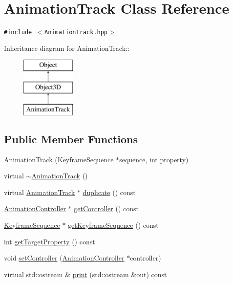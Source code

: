 \hypertarget{classm3g_1_1AnimationTrack}{
\section{AnimationTrack Class Reference}
\label{classm3g_1_1AnimationTrack}
}
{\tt \#include $<$AnimationTrack.hpp$>$}

Inheritance diagram for AnimationTrack::\begin{figure}[H]
\begin{center}
\leavevmode
\includegraphics[height=3cm]{classm3g_1_1AnimationTrack}
\end{center}
\end{figure}
\subsection*{Public Member Functions}
\begin{CompactItemize}
\item 
\hyperlink{classm3g_1_1AnimationTrack_e27012f60e982597d6e504c488e51106}{AnimationTrack} (\hyperlink{classm3g_1_1KeyframeSequence}{KeyframeSequence} $\ast$sequence, int property)
\item 
virtual \hyperlink{classm3g_1_1AnimationTrack_f7f1bc360c298d4a2f2436889159205c}{$\sim$AnimationTrack} ()
\item 
virtual \hyperlink{classm3g_1_1AnimationTrack}{AnimationTrack} $\ast$ \hyperlink{classm3g_1_1AnimationTrack_e19aae30ee68ef05afd74ec9c19cf7d1}{duplicate} () const 
\item 
\hyperlink{classm3g_1_1AnimationController}{AnimationController} $\ast$ \hyperlink{classm3g_1_1AnimationTrack_3a54e89528127de5b4d0a48a2045a91c}{getController} () const 
\item 
\hyperlink{classm3g_1_1KeyframeSequence}{KeyframeSequence} $\ast$ \hyperlink{classm3g_1_1AnimationTrack_e83c81771a8329e1e5f978f228c0b308}{getKeyframeSequence} () const 
\item 
int \hyperlink{classm3g_1_1AnimationTrack_143de0bf90b434f1487caae5b0b66bbf}{getTargetProperty} () const 
\item 
void \hyperlink{classm3g_1_1AnimationTrack_639279dfdc74095fcb28d0c25aeec6df}{setController} (\hyperlink{classm3g_1_1AnimationController}{AnimationController} $\ast$controller)
\item 
virtual std::ostream \& \hyperlink{classm3g_1_1AnimationTrack_6fea17fa1532df3794f8cb39cb4f911f}{print} (std::ostream \&out) const 
\end{CompactItemize}
